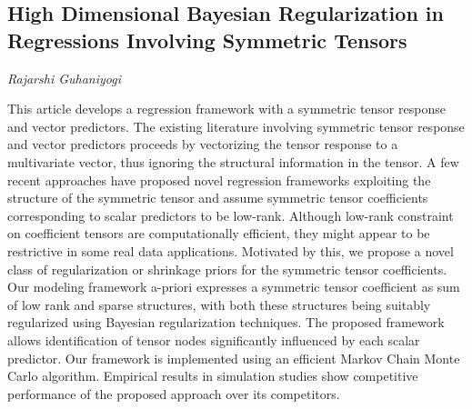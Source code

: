 \documentclass[../booklet.tex]{subfiles}
\begin{document}
\subsection[High Dimensional Bayesian Regularization in Regressions Involving Symmetric Tensors. {\it Rajarshi Guhaniyogi}]{High Dimensional Bayesian Regularization in Regressions Involving Symmetric Tensors}

\begin{center}
  {\it Rajarshi Guhaniyogi}
\end{center}

\vskip 0.8cm


This article develops a regression framework with a symmetric tensor response and vector predictors. The existing literature involving symmetric tensor response and vector predictors proceeds by vectorizing the tensor response to a multivariate vector, thus ignoring the structural information in the tensor. A few recent approaches have proposed novel regression frameworks exploiting the structure of the symmetric tensor and assume symmetric tensor coefficients corresponding to scalar predictors to be low-rank. Although low-rank constraint on coefficient tensors are computationally efficient, they might appear to be restrictive in some real data applications.  Motivated by this, we propose a novel class of regularization or shrinkage priors for the symmetric tensor coefficients. Our modeling framework a-priori expresses a symmetric tensor coefficient as sum of low rank and sparse structures, with both these structures being suitably regularized using Bayesian regularization techniques. The proposed framework allows identification of tensor nodes significantly influenced by each scalar predictor. Our framework is implemented using an efficient Markov Chain Monte Carlo algorithm. Empirical results in simulation studies show competitive performance of the proposed approach over its competitors.

\end{document}
